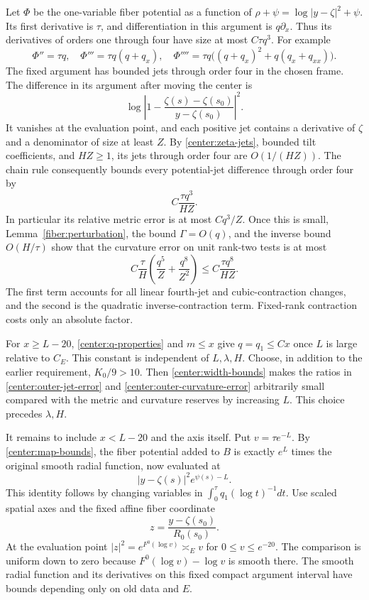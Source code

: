 Let $\Phi$ be the one-variable fiber potential as a function of
$\rho+\psi=\log|y-\zeta|^2+\psi$. Its first derivative is $\tau$, and differentiation in this argument is $q\partial_x$. Thus its derivatives of orders one through four have size at most $C\tau q^3$. For example
\[
 \Phi''=\tau q,\quad
 \Phi'''=\tau q(q+q_x),\quad
 \Phi''''=\tau q\bigl((q+q_x)^2+q(q_x+q_{xx})\bigr).
\]
The fixed argument has bounded jets through order four in the chosen frame. The difference in its argument after moving the center is
\begin{equation}\label{center:log-argument-difference}
 \log\left|1-\frac{\zeta(s)-\zeta(s_0)}{y-\zeta(s_0)}\right|^2.
\end{equation}
It vanishes at the evaluation point, and each positive jet contains a derivative of $\zeta$ and a denominator of size at least $Z$. By \eqref{center:zeta-jets}, bounded tilt coefficients, and $HZ\ge1$, its jets through order four are $O(1/(HZ))$. The chain rule consequently bounds every potential-jet difference through order four by
\begin{equation}\label{center:outer-jet-error}
 C\frac{\tau q^3}{HZ}.
\end{equation}
In particular its relative metric error is at most $Cq^3/Z$. Once this is small, Lemma~\ref{fiber:perturbation}, the bound $\Gamma=O(q)$, and the inverse bound $O(H/\tau)$ show that the curvature error on unit rank-two tests is at most
\begin{equation}\label{center:outer-curvature-error}
 C\frac{\tau}{H}\left(\frac{q^5}{Z}
                            +\frac{q^8}{Z^2}\right)
 \le C\frac{\tau q^8}{HZ}.
\end{equation}
The first term accounts for all linear fourth-jet and cubic-contraction changes, and the second is the quadratic inverse-contraction term. Fixed-rank contraction costs only an absolute factor.

For $x\ge L-20$, \eqref{center:q-properties} and $m\le x$ give $q=q_1\le Cx$ once $L$ is large relative to $C_E$. This constant is independent of $L,\lambda,H$. Choose, in addition to the earlier requirement, $K_0/9>10$. Then \eqref{center:width-bounds} makes the ratios in \eqref{center:outer-jet-error} and \eqref{center:outer-curvature-error} arbitrarily small compared with the metric and curvature reserves by increasing $L$. This choice precedes $\lambda,H$.

It remains to include $x<L-20$ and the axis itself. Put $v=\tau e^{-L}$. By \eqref{center:map-bounds}, the fiber potential added to $B$ is exactly $e^L$ times the original smooth radial function, now evaluated at
\[
 |y-\zeta(s)|^2e^{\psi(s)-L}.
\]
This identity follows by changing variables in $\int_0^\tau q_1(\log t)^{-1}dt$. Use scaled spatial axes and the fixed affine fiber coordinate
\[
 z=\frac{y-\zeta(s_0)}{R_0(s_0)}.
\]
At the evaluation point $|z|^2=e^{F^0(\log v)}\asymp_E v$ for $0\le v\le e^{-20}$. The comparison is uniform down to zero because $F^0(\log v)-\log v$ is smooth there. The smooth radial function and its derivatives on this fixed compact argument interval have bounds depending only on old data and $E$.


